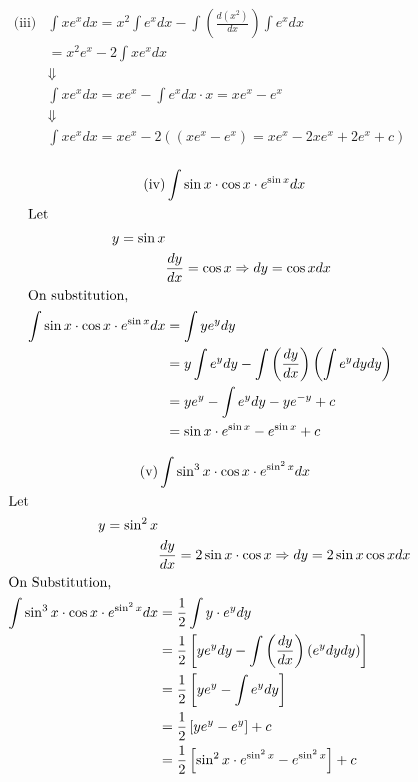 \documentclass{article}
\begin{document}
\begin{align*}
\text{(iii)} & \int x e^x dx = x^2 \int e^x dx - \int \left( \frac{d(x^2)}{dx} \right) \int e^x dx \\
                & = x^2 e^x - 2 \int x e^x dx \\
                & \Downarrow \\
                & \int x e^x dx = x e^x - \int e^x dx \cdot x = x e^x - e^x \\
                & \Downarrow \\
                & \int x e^x dx = x e^x - 2 \left( (x e^x - e^x) = x e^x - 2 x e^x + 2e^x + c \right) \\
\end{align*}

\begin{align*}
\text{(iv)} & \int \sin x \cdot \cos x \cdot e^{\sin x} dx \\
\intertext{Let } y = \sin x \\
            & \frac{dy}{dx} = \cos x \Rightarrow dy = \cos x dx \\
\intertext{On substitution,}
    \int \sin x \cdot \cos x \cdot e^{\sin x} dx &= \int y e^y dy \\
                                                  &= y \int e^y dy - \int \left( \frac{dy}{dx} \right) \left( \int e^y dy dy \right) \\
                                                  &= y e^y - \int e^y dy - y e^{-y} + c \\
                                                  &= \sin x \cdot e^{\sin x} - e^{\sin x} + c
\end{align*}

\begin{align*}
\text{(v)} & \int \sin^3 x \cdot \cos x \cdot e^{\sin^2 x} dx \\
\intertext{Let } y = \sin^2 x \\
              & \frac{dy}{dx} = 2 \sin x \cdot \cos x \Rightarrow dy = 2 \sin x \cos x dx \\
\intertext{On Substitution,}
    \int \sin^3 x \cdot \cos x \cdot e^{\sin^2 x} dx &= \frac{1}{2} \int y \cdot e^y dy \\
                                                     &= \frac{1}{2} \left[ y e^y dy - \int \left(\frac{dy}{dx}\right) \left(e^y dy dy\right) \right] \\
                                                     &= \frac{1}{2} \left[ y e^y - \int e^y dy \right] \\
                                                     &= \frac{1}{2} \left[ y e^y - e^y \right] + c \\
                                                     &= \frac{1}{2} \left[ \sin^2 x \cdot e^{\sin^2 x} - e^{\sin^2 x} \right] + c \\
\end{align*}
\end{document}
